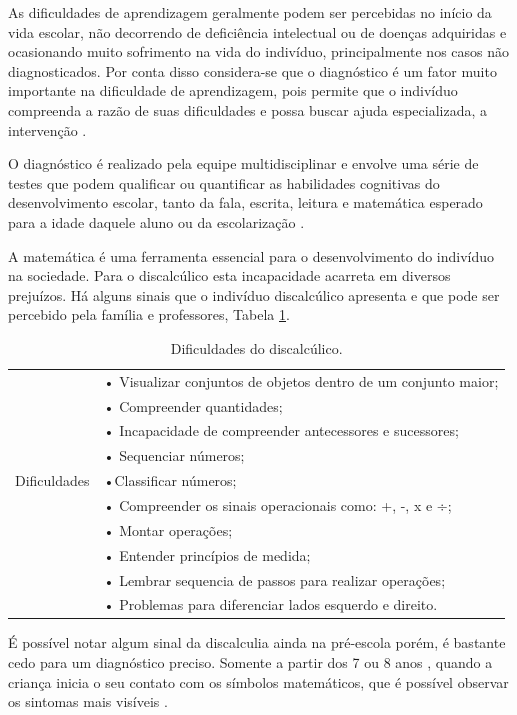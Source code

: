 \documentclass[
	12pt,				%
    oneside,			%
	a4paper,			%
	english,			%
	french,				%
	spanish,			%
	brazil,				%
	]{abntex2}
\begin{document}
As dificuldades de aprendizagem geralmente podem ser percebidas no início da vida escolar, não decorrendo de deficiência intelectual ou de doenças adquiridas e ocasionando muito sofrimento na vida do indivíduo, principalmente nos casos não diagnosticados. Por conta disso considera-se que o diagnóstico é um fator muito importante na dificuldade de aprendizagem, pois permite que o indivíduo compreenda a razão de suas dificuldades e possa buscar ajuda especializada, a intervenção \cite{Spinello}.


O diagnóstico é realizado pela equipe multidisciplinar e envolve uma série de testes que podem qualificar ou quantificar as habilidades cognitivas do desenvolvimento escolar, tanto da fala, escrita, leitura e matemática esperado para a idade daquele aluno ou da escolarização \cite{Villar}.

A matemática é uma ferramenta essencial para o desenvolvimento do indivíduo na sociedade. Para o discalcúlico esta incapacidade acarreta em diversos prejuízos. Há alguns sinais que o indivíduo discalcúlico apresenta e que pode ser percebido pela família e professores, Tabela \ref{sinais}.
 
 
\begin{table}[ht]
\centering
\caption{Dificuldades do discalcúlico.}
\label{sinais}
\begin{tabular}{|l|l|}
\hline
 & • Visualizar conjuntos de objetos dentro de um conjunto maior;\\
& • Compreender quantidades; \\
& • Incapacidade de compreender antecessores e sucessores; \\ 
 & • Sequenciar números; \\
Dificuldades & •Classificar números;\\
& • Compreender os sinais operacionais como: +, -, x e ÷; \\ 
& • Montar operações; \\
& • Entender princípios de medida; \\
& • Lembrar sequencia de passos para realizar operações;\\
& • Problemas para diferenciar lados esquerdo e direito.\\\hline
\end{tabular}
\centering
{}
\end{table}


É possível notar algum sinal da discalculia ainda na pré-escola porém,  é bastante cedo para um diagnóstico preciso. Somente a partir dos 7 ou 8 anos , quando a criança inicia o seu contato com os símbolos matemáticos, que é possível observar os sintomas mais visíveis \cite{Jacinto}.
\end{document}
